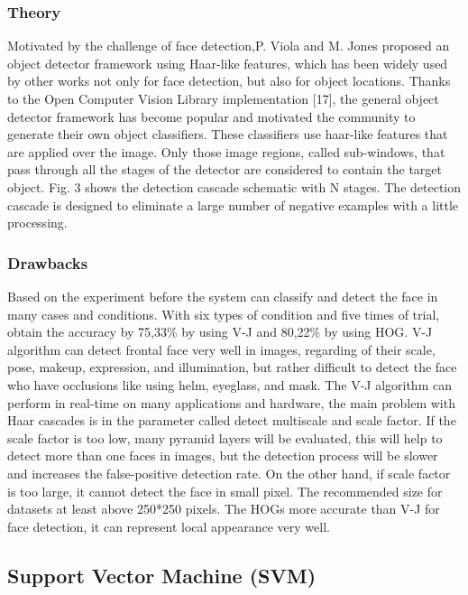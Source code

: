 \documentclass[a4paper]{article}
\begin{document}
\subsubsection{Theory}
Motivated by the challenge of face detection,P. Viola and M. Jones proposed
an object detector framework using Haar-like features, which
has been widely used by other works not only for face
detection, but also for object locations.
Thanks to the Open Computer Vision Library
implementation [17], the general object detector framework
has become popular and motivated the community to generate
their own object classifiers. These classifiers use haar-like
features that are applied over the image. Only those image
regions, called sub-windows, that pass through all the stages of
the detector are considered to contain the target object. Fig. 3
shows the detection cascade schematic with N stages. The
detection cascade is designed to eliminate a large number of
negative examples with a little processing.\cite{padilla2012evaluation}
\subsubsection{Drawbacks}
Based on the experiment before the system can classify and detect the face in many cases and conditions.
With six types of condition and five times of trial, obtain the accuracy by 75,33\% by using V-J and
80,22\% by using HOG. V-J algorithm can detect frontal face very well in images, regarding of their
scale, pose, makeup, expression, and illumination, but rather difficult to detect the face who have
occlusions like using helm, eyeglass, and mask. The V-J algorithm can perform in real-time on many
applications and hardware, the main problem with Haar cascades is in the parameter called detect
multiscale and scale factor. If the scale factor is too low, many pyramid layers will be evaluated, this
will help to detect more than one faces in images, but the detection process will be slower and increases
the false-positive detection rate. On the other hand, if scale factor is too large, it cannot detect the face
in small pixel. The recommended size for datasets at least above 250*250 pixels. The HOGs more
accurate than V-J for face detection, it can represent local appearance very well\cite{rahmad2020comparison}.
\subsection{Support Vector Machine (SVM)}
\end{document}
